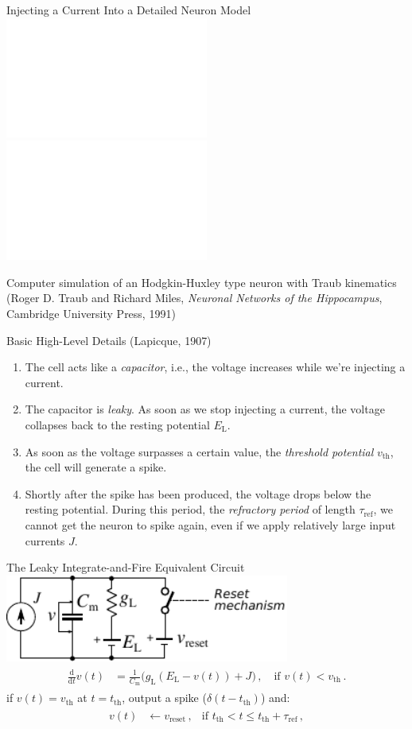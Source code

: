 \documentclass[handout,aspectratio=169]{beamer}
\begin{document}
\begin{frame}{Injecting a Current Into a Detailed Neuron Model}
	\includegraphics<1->[width=0.5\textwidth]{media/hh_neuron_sub_threshold.pdf}%
	\includegraphics<2->[width=0.5\textwidth]{media/hh_neuron_super_threshold.pdf}

	\centering
	{\tiny\color{aluminium4} Computer simulation of an Hodgkin-Huxley type neuron with Traub kinematics (Roger D. Traub and Richard Miles, \emph{Neuronal Networks of the Hippocampus},
	Cambridge University Press, 1991)}
\end{frame}

\begin{frame}{Basic High-Level Details (Lapicque, 1907)}
	\begin{enumerate}
		\item The cell acts like a \emph{capacitor}, i.e., the voltage increases while we're injecting a current.
		\item The capacitor is \emph{leaky}. As soon as we stop injecting a current, the voltage collapses back to the resting potential $E_\mathrm{L}$.
		\item As soon as the voltage surpasses a certain value, the \emph{threshold potential} $v_\mathrm{th}$, the cell will generate a spike.
		\item Shortly after the spike has been produced, the voltage drops below the resting potential. During this period, the \emph{refractory period} of length $\tau_\mathrm{ref}$, we cannot get the neuron to spike again, even if we apply relatively large input currents $J$.
	\end{enumerate}

\end{frame}

\begin{frame}{The Leaky Integrate-and-Fire Equivalent Circuit}
	\centering
	\includegraphics[width=0.7\textwidth]{media/lif_circuit.pdf}
	\begin{align*}
		\begin{aligned}
			\frac{\mathrm{d}}{\mathrm{d}t} v(t) &= \frac{1}{C_\mathrm{m}} \big(g_\mathrm{L} (E_\mathrm{L} - v(t))
			+ J
			\big) \,, \quad \text{if } v(t) < v_\mathrm{th}\,.
		\end{aligned}
	\end{align*}
	if $v(t) = v_\mathrm{th}$ at $t = t_\mathrm{th}$, output a spike ($\delta(t - t_\mathrm{th})$) and:
	\begin{align*}
		\begin{aligned}
			v(t) &\gets v_\mathrm{reset} \,, &\text{if } t_\mathrm{th} < t \leq t_\mathrm{th} + \tau_\mathrm{ref} \,,
		\end{aligned}
		\label{eqn:super-threshold}
	\end{align*}

\end{frame}
\end{document}
